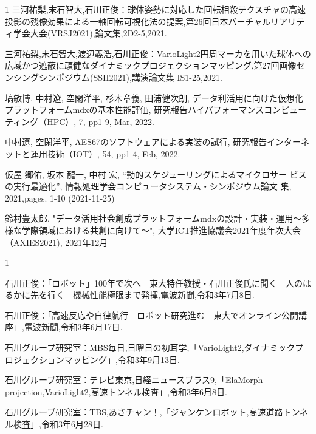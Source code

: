 \begin{発表}{1}
三河祐梨,末石智大,石川正俊：球体姿勢に対応した回転相殺テクスチャの高速投影の残像効果による一軸回転可視化法の提案,第26回日本バーチャルリアリティ学会大会(VRSJ2021),論文集,2D2-5,2021.

三河祐梨,末石智大,渡辺義浩,石川正俊：VarioLight2円周マーカを用いた球体への広域かつ遮蔽に頑健なダイナミックプロジェクションマッピング,第27回画像センシングシンポジウム(SSII2021),講演論文集 IS1-25,2021.

塙敏博, 中村遼, 空閑洋平, 杉木章義, 田浦健次朗, データ利活用に向けた仮想化プラットフォームmdxの基本性能評価, 研究報告ハイパフォーマンスコンピューティング（HPC）, 7, pp1-9, Mar, 2022.

中村遼, 空閑洋平, AES67のソフトウェアによる実装の試行, 研究報告インターネットと運用技術（IOT）, 54, pp1-4, Feb, 2022.

仮屋 郷佑, 坂本 龍一, 中村 宏, ``動的スケジューリングによるマイクロサー
ビスの実行最適化'', 情報処理学会コンピュータシステム・シンポジウム論文
集, 2021,pages. 1-10 (2021-11-25)


鈴村豊太郎, "データ活用社会創成プラットフォームmdxの設計・実装・運用〜多様な学際領域における共創に向けて～", 大学ICT推進協議会2021年度年次大会（AXIES2021), 2021年12月
\end{発表}


\begin{報道}{1}

石川正俊：「ロボット」100年で次へ　東大特任教授・石川正俊氏に聞く　人のはるかに先を行く　機械性能極限まで発揮,電波新聞,令和3年7月8日.

石川正俊：「高速反応や自律航行　ロボット研究進む　東大でオンライン公開講座」,電波新聞,令和3年6月17日.

石川グループ研究室：MBS毎日,日曜日の初耳学,「VarioLight2,ダイナミックプロジェクションマッピング」,令和3年9月13日.

石川グループ研究室：テレビ東京,日経ニュースプラス9,「ElaMorph projection,VarioLight2,高速トンネル検査」,令和3年6月8日.

石川グループ研究室：TBS,あさチャン！,「ジャンケンロボット,高速道路トンネル検査」,令和3年6月28日.


\end{報道}
